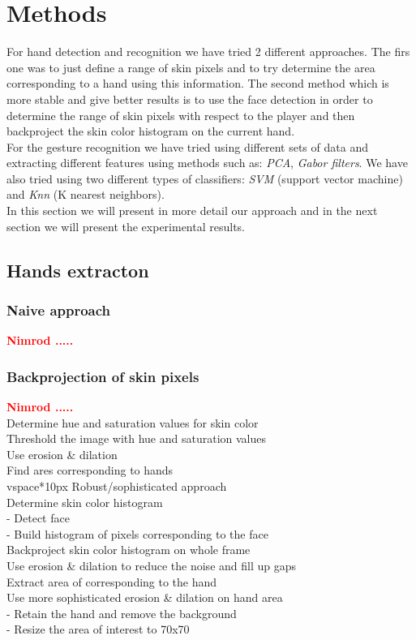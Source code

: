 \documentclass[a4paper, 11pt, twocolumn]{article}
\newcommand{\todo}[1]{\textcolor{red}{\textbf{#1}}}
\begin{document}
    \section{Methods}
	\label{sec:methods}
		For hand detection and recognition we have tried 2 different approaches. The firs one was to just define a range of skin pixels and to try determine the area corresponding to a hand using this information. The second method which is more stable and give better results is to use the face detection in order to determine the range of skin pixels with respect to the player and then backproject the skin color histogram on the current hand.\\
		\hspace*{10px}For the gesture recognition we have tried using different sets of data and extracting different features using methods such as: \emph{PCA}, \emph{Gabor filters}. We have also tried using two different types of classifiers: \emph{SVM} (support vector machine) and \emph{Knn} (K nearest neighbors).\\
		\hspace*{10px}In this section we will present in more detail our approach and in the next section we will present the experimental results. 
        \subsection{Hands extracton}
		\label{sec:Meth_exrctHands}
        \subsubsection{Naive approach}
		\todo{Nimrod .....}\\

        \subsubsection{Backprojection of skin pixels}
        \todo{Nimrod .....}\\
        Determine hue and saturation values for skin color\\
        Threshold the image with hue and saturation values\\
        Use erosion \& dilation\\
        Find ares corresponding to hands\\
        vspace*{10px}
        Robust/sophisticated approach\\
        Determine skin color histogram\\
        - Detect face\\
        - Build histogram of pixels corresponding to the face\\
        Backproject skin color histogram on whole frame\\
        Use erosion \& dilation to reduce the noise and fill up gaps\\
        Extract area of corresponding to the hand\\
        Use more sophisticated erosion \& dilation on hand area\\
        - Retain the hand and remove the background\\
        - Resize the area of interest to 70x70
\end{document}
